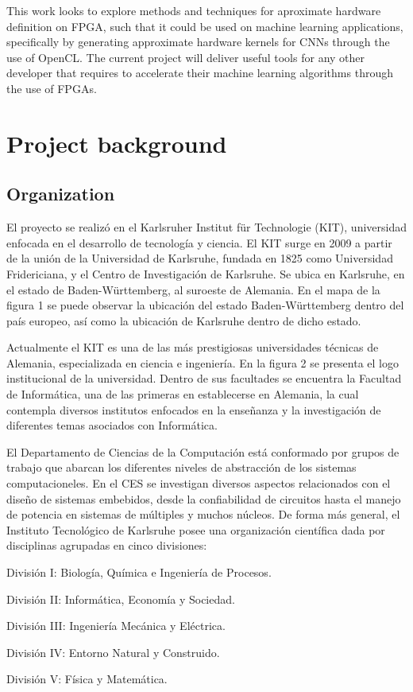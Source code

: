 This work looks to explore methods and techniques for aproximate hardware definition on FPGA, such that
it could be used on machine learning applications, specifically by generating approximate hardware
kernels for CNNs through the use of OpenCL. The current project will deliver useful tools for any 
other developer that requires to accelerate their machine learning algorithms through the use of FPGAs.

\section{Project background}

\subsection{Organization}

El proyecto se realizó en el Karlsruher Institut für Technologie (KIT), universidad enfocada en el
desarrollo de tecnología y ciencia. El KIT surge en 2009 a partir de la unión de la Universidad de
Karlsruhe, fundada en 1825 como Universidad Fridericiana, y el Centro de Investigación de Karlsruhe. Se
ubica en Karlsruhe, en el estado de Baden-Württemberg, al suroeste de Alemania. En el mapa de la
figura 1 se puede observar la ubicación del estado Baden-Württemberg dentro del país europeo, así
como la ubicación de Karlsruhe dentro de dicho estado.

Actualmente el KIT es una de las más prestigiosas universidades técnicas de Alemania, especializada en
ciencia e ingeniería. En la figura 2 se presenta el logo institucional de la universidad. Dentro de sus
facultades se encuentra la Facultad de Informática, una de las primeras en establecerse en Alemania, la
cual contempla diversos institutos enfocados en la enseñanza y la investigación de diferentes temas
asociados con Informática.

El Departamento de Ciencias de la Computación está conformado por grupos de trabajo que abarcan los
diferentes niveles de abstracción de los sistemas computacioneles. En el CES se investigan diversos 
aspectos relacionados con el diseño de sistemas embebidos, desde la confiabilidad de circuitos
hasta el manejo de potencia en sistemas de múltiples y muchos núcleos. De forma más general, el
Instituto Tecnológico de Karlsruhe posee una organización científica dada por disciplinas agrupadas en
cinco divisiones:

\begin{compactitem}
    \item División I: Biología, Química e Ingeniería de Procesos.
    \item División II: Informática, Economía y Sociedad.
    \item División III: Ingeniería Mecánica y Eléctrica.
    \item División IV: Entorno Natural y Construido.
    \item División V: Física y Matemática.
\end{compactitem}


